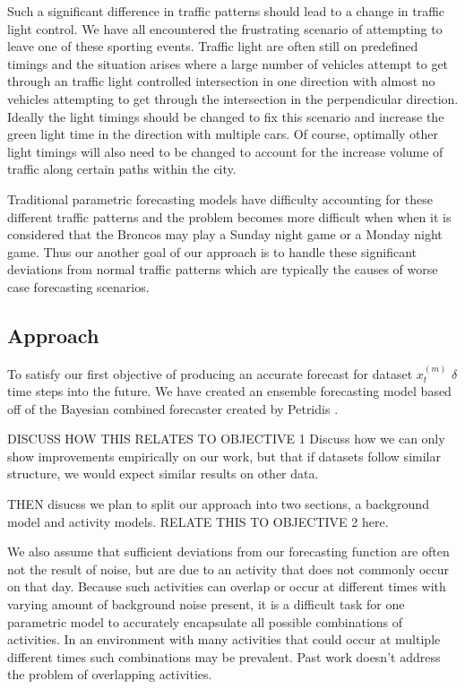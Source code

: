 Such a significant difference in traffic patterns should lead to a change in traffic light control.  We have all encountered the frustrating scenario of attempting to leave one of these sporting events.  Traffic light are often still on predefined timings and the situation arises where a large number of vehicles attempt to get through an traffic light controlled intersection in one direction with almost no vehicles attempting to get through the intersection in the perpendicular direction.  Ideally the light timings should be changed to fix this scenario and increase the green light time in the direction with multiple cars.  Of course, optimally other light timings will also need to be changed to account for the increase volume of traffic along certain paths within the city.

Traditional parametric forecasting models have difficulty accounting for these different traffic patterns and the problem becomes more difficult when when it is considered that the Broncos may play a Sunday night game or a Monday night game.  Thus our another goal of our approach is to handle these significant deviations from normal traffic patterns which are typically the causes of worse case forecasting scenarios.


\subsection{Approach}
To satisfy our first objective of producing an accurate forecast for dataset $x_{t}^(m)$ $\delta$ time steps into the future. We have created an ensemble forecasting model based off of the Bayesian combined forecaster created by Petridis \cite{2001}.  

DISCUSS HOW THIS RELATES TO OBJECTIVE 1
Discuss how we can only show improvements empirically on our work, but that if datasets follow similar structure, we would expect similar results on other data.


THEN disucss we plan to split our approach into two sections, a background model and activity models.  RELATE THIS TO OBJECTIVE 2 here.

We also assume that sufficient deviations from our forecasting function are often not the result of noise, but are due to an activity that does not commonly occur on that day.  Because such activities can overlap or occur at different times with varying amount of background noise present, it is a difficult task for one parametric model to accurately encapsulate all possible combinations of activities.  In an environment with many activities that could occur at multiple different times such combinations may be prevalent.  Past work doesn't address the problem of overlapping activities.  

